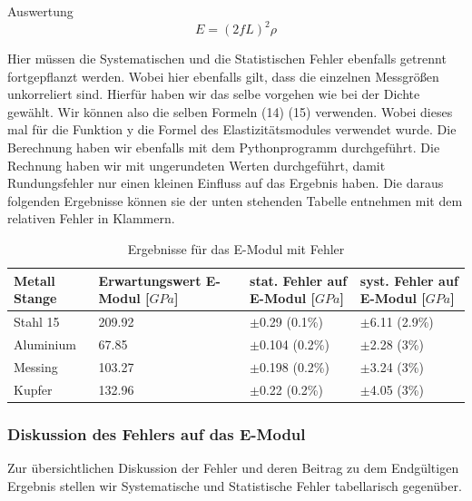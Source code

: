 \documentclass[twoside]{protokoll}
\begin{document}
\begin{aufgabe}{Auswertung}
    \begin{equation}
         E = (2fL)^2 \rho
    \end{equation}
    
Hier müssen die Systematischen und die Statistischen Fehler ebenfalls getrennt fortgepflanzt werden. Wobei hier ebenfalls gilt, dass die einzelnen Messgrößen 
unkorreliert sind. Hierfür haben wir das selbe vorgehen wie bei der Dichte gewählt.
Wir können also die selben Formeln (14) (15) verwenden. 
Wobei dieses mal für die Funktion y die Formel des Elastizitätsmodules verwendet wurde. Die Berechnung haben wir ebenfalls mit dem Pythonprogramm durchgeführt. 
Die Rechnung haben wir mit ungerundeten Werten durchgeführt, damit Rundungsfehler nur einen kleinen Einfluss auf das Ergebnis haben. 
Die daraus folgenden Ergebnisse können sie der unten stehenden Tabelle entnehmen mit dem relativen Fehler in Klammern.

 \begin{table}[H]
        \centering
        \begin{tabularx}{1\textwidth}{X X X X} %
            \toprule
            \textbf{Metall Stange} & \textbf{Erwartungswert E-Modul [$GPa$]} & \textbf{stat. Fehler auf E-Modul [$GPa$]} & \textbf{syst. Fehler auf E-Modul [$GPa$]}\\
            \midrule
            Stahl 15 & 209.92 & $\pm$0.29  (0.1\%) & $\pm$6.11 (2.9\%) \\
            Aluminium & 67.85 & $\pm$0.104 (0.2\%) & $\pm$2.28 (3\%) \\
            Messing & 103.27  & $\pm$0.198 (0.2\%) & $\pm$3.24 (3\%) \\
            Kupfer & 132.96   & $\pm$0.22  (0.2\%) & $\pm$4.05 (3\%) \\
            \bottomrule
        \end{tabularx}
        \label{tab:mytable}
        \caption{Ergebnisse für das E-Modul mit Fehler}
    \end{table}

\subsubsection{Diskussion des Fehlers auf das E-Modul}
Zur übersichtlichen Diskussion der Fehler und deren Beitrag zu dem Endgültigen Ergebnis stellen wir Systematische und Statistische Fehler tabellarisch gegenüber.


\end{aufgabe}
\end{document}
